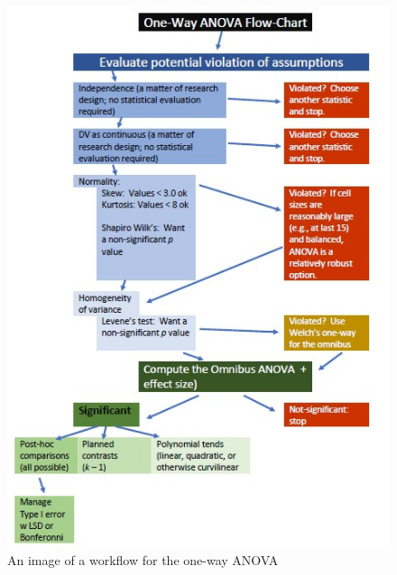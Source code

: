 \documentclass[
  english,
]{book}
\begin{document}
\begin{figure}
\centering
\includegraphics{images/OnewayWrkFlw.jpg}
\caption{An image of a workflow for the one-way ANOVA}
\end{figure}
\end{document}
